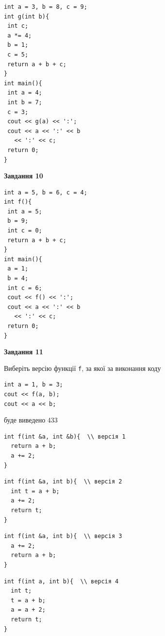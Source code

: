 \documentclass[12pt, ukrainian]{article}
\def\code#1{\Verb!#1!}
\begin{document}
{\begin {large}
\begin{minipage}[t]{7.0cm}
\begin{verbatim}
int a = 3, b = 8, c = 9;
int g(int b){
 int c;
 a *= 4;
 b = 1;
 c = 5;
 return a + b + c;
}
int main(){
 int a = 4;
 int b = 7;
 c = 3;
 cout << g(a) << ':';
 cout << a << ':' << b 
   << ':' << c;
 return 0;
}
\end{verbatim}



\begin{center}
\textbf{Завдання 10}
\end{center}
\vspace{-8mm}

\begin{verbatim}
int a = 5, b = 6, c = 4;
int f(){
 int a = 5;
 b = 9;
 int c = 0;
 return a + b + c;
}
int main(){
 a = 1;
 b = 4;
 int c = 6;
 cout << f() << ':';
 cout << a << ':' << b 
   << ':' << c;
 return 0;
}
\end{verbatim}

\end{minipage}
\vline \hspace{1mm}
\begin{minipage}[t]{11.0cm}

\begin{center}
\textbf{Завдання 11}
\end{center}
Виберіть версію функції \code{f}, за якої за виконання коду
\begin{verbatim}
int a = 1, b = 3;
cout << f(a, b);
cout << a << b;
\end{verbatim}

буде виведено 433

\begin{verbatim}
int f(int &a, int &b){  \\ версія 1
  return a + b;
  a += 2;
}
\end{verbatim}

\vspace{-8mm}\begin{verbatim}
int f(int &a, int b){  \\ версія 2
  int t = a + b;
  a += 2;
  return t;
}
\end{verbatim}

\vspace{-8mm}\begin{verbatim}
int f(int &a, int b){  \\ версія 3
  a += 2;
  return a + b;
}
\end{verbatim}

\vspace{-8mm}\begin{verbatim}
int f(int a, int b){  \\ версія 4
  int t;
  t = a + b;
  a = a + 2;
  return t;
}
\end{verbatim}




\end{minipage}
\end{large}}
\end{document}
